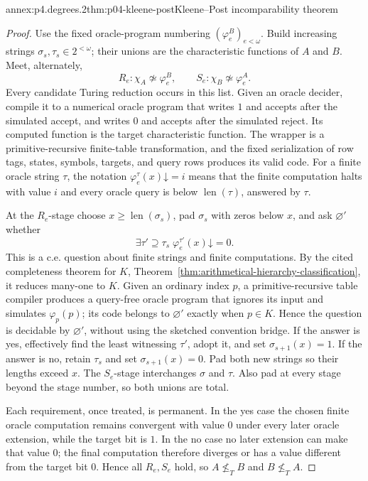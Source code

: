 \begin{annexitem}{annex:p4.degrees.2}{thm:p04-kleene-post}{Kleene--Post incomparability theorem}
\begin{proof}
Use the fixed oracle-program numbering \((\varphi_e^B)_{e<\omega}\).  Build
increasing strings \(\sigma_s,\tau_s\in2^{<\omega}\); their unions are the
characteristic functions of \(A\) and \(B\).  Meet, alternately,
\[
 R_e:\chi_A\not\simeq\varphi_e^B,
 \qquad S_e:\chi_B\not\simeq\varphi_e^A.
\]
Every candidate Turing reduction occurs in this list.  Given an oracle decider,
compile it to a numerical oracle program that writes \(1\) and accepts after
the simulated accept, and writes \(0\) and accepts after the simulated reject.
Its computed function is the target characteristic function.  The wrapper is
a primitive-recursive finite-table transformation, and the fixed serialization
of row tags, states, symbols, targets, and query rows produces its valid code.
For a finite oracle string \(\tau\), the notation
\(\varphi_e^\tau(x)\mathord\downarrow=i\) means that the finite computation
halts with value \(i\) and every oracle query is below \(\operatorname{len}(\tau)\),
answered by \(\tau\).

At the \(R_e\)-stage choose
\(x\geq\operatorname{len}(\sigma_s)\), pad \(\sigma_s\) with zeros below
\(x\), and ask \(\varnothing'\) whether
\[
 \exists\tau'\supseteq\tau_s\;
       \varphi_e^{\tau'}(x)\mathord\downarrow=0.
\]
This is a c.e. question about finite strings and finite computations.  By the
cited completeness theorem for \(K\),
Theorem~\ref{thm:arithmetical-hierarchy-classification}, it reduces many-one
to \(K\).  Given an
ordinary index \(p\), a primitive-recursive table compiler produces a
query-free oracle program that ignores its input and simulates
\(\varphi_p(p)\); its code belongs to \(\varnothing'\) exactly when
\(p\in K\).  Hence the question is decidable by \(\varnothing'\), without
using the sketched convention bridge.  If the
answer is yes, effectively find the least witnessing \(\tau'\), adopt it, and
set \(\sigma_{s+1}(x)=1\).  If the answer is no, retain \(\tau_s\) and set
\(\sigma_{s+1}(x)=0\).  Pad both new strings so their lengths exceed \(x\).
The \(S_e\)-stage interchanges \(\sigma\) and \(\tau\).  Also pad at every
stage beyond the stage number, so both unions are total.

Each requirement, once treated, is permanent.  In the yes case the chosen
finite oracle computation remains convergent with value \(0\) under every
later oracle extension, while the target bit is \(1\).  In the no case no
later extension can make that value \(0\); the final computation therefore
diverges or has a value different from the target bit \(0\).  Hence all
\(R_e,S_e\) hold, so \(A\not\leq_TB\) and \(B\not\leq_TA\).


\end{proof}
\end{annexitem}
